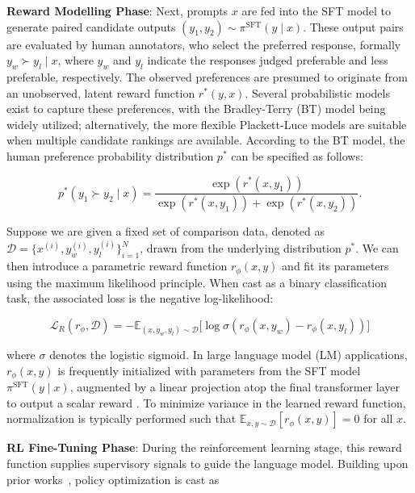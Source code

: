 \textbf{Reward Modelling Phase}: Next, prompts $x$ are fed into the SFT model to generate paired candidate outputs $(y_1, y_2)\sim \pi^\text{SFT}(y \mid x)$. These output pairs are evaluated by human annotators, who select the preferred response, formally $y_w\succ y_l \mid x$, where $y_w$ and $y_l$ indicate the responses judged preferable and less preferable, respectively. The observed preferences are presumed to originate from an unobserved, latent reward function $r^*(y, x)$. Several probabilistic models exist to capture these preferences, with the Bradley-Terry (BT) model \cite{bradley1952rankanalysis} being widely utilized; alternatively, the more flexible Plackett-Luce models \citep{plackett1975analysis, luce2012individual} are suitable when multiple candidate rankings are available. According to the BT model, the human preference probability distribution $p^*$ can be specified as follows:

\begin{equation}\label{eq:bradley-terry}
    p^*(y_1\succ y_2 \mid x)=\frac{\exp\left(r^*(x, y_1)\right)}{\exp\left(r^*(x, y_1)\right) + \exp\left(r^*(x, y_2)\right)}.
\end{equation}

Suppose we are given a fixed set of comparison data, denoted as $\mathcal{D} = \bigl\{x^{(i)}, y_w^{(i)}, y_l^{(i)}\bigr\}_{i=1}^N$, drawn from the underlying distribution $p^*$. We can then introduce a parametric reward function $r_{\phi}(x, y)$ and fit its parameters using the maximum likelihood principle. When cast as a binary classification task, the associated loss is the negative log-likelihood:

\begin{equation}\label{eq:reward_model}
    \mathcal{L}_R(r_{\phi}, \mathcal{D}) = -\mathbb{E}_{(x, y_w, y_l)\sim \mathcal{D}}\bigl[\log \sigma(r_{\phi}(x, y_w)- r_{\phi}(x, y_l))\bigr]
\end{equation}

where $\sigma$ denotes the logistic sigmoid. In large language model (LM) applications, $r_{\phi}(x, y)$ is frequently initialized with parameters from the SFT model $\pi^\text{SFT}(y \mid x)$, augmented by a linear projection atop the final transformer layer to output a scalar reward \cite{ziegler2020finetuning}. To minimize variance in the learned reward function, normalization is typically performed such that  $\mathbb{E}_{x,y\sim \mathcal{D}}\left[r_\phi(x, y)\right] = 0$ for all $x$.

\textbf{RL Fine-Tuning Phase}: During the reinforcement learning stage, this reward function supplies supervisory signals to guide the language model. Building upon prior works~\citep{jaques2017sequence, jaques2020human}, policy optimization is cast as

